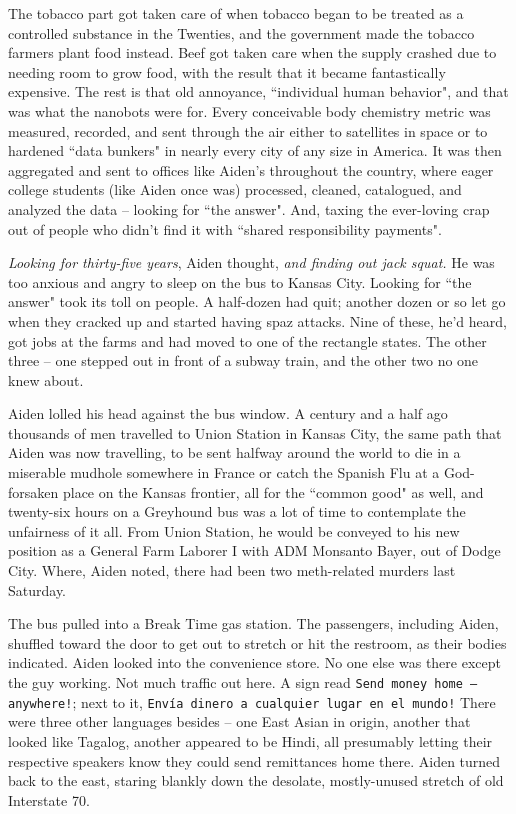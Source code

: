 \documentclass[11pt]{book}
\begin{document}
	The tobacco part got taken care of when tobacco began to be treated as a controlled substance in the Twenties, and the government made the tobacco farmers plant food instead. Beef got taken care when the supply crashed due to needing room to grow food, with the result that it became fantastically expensive. The rest is that old annoyance, ``individual human behavior", and that was what the nanobots were for. Every conceivable body chemistry metric was measured, recorded, and sent through the air either to satellites in space or to hardened ``data bunkers" in nearly every city of any size in America. It was then aggregated and sent to offices like Aiden's throughout the country, where eager college students (like Aiden once was) processed, cleaned, catalogued, and analyzed the data -- looking for ``the answer". And, taxing the ever-loving crap out of people who didn't find it with ``shared responsibility payments".
	
	\textit{Looking for thirty-five years}, Aiden thought, \textit{and finding out jack squat.} He was too anxious and angry to sleep on the bus to Kansas City. Looking for ``the answer" took its toll on people. A half-dozen had quit; another dozen or so let go when they cracked up and started having spaz attacks. Nine of these, he'd heard, got jobs at the farms and had moved to one of the rectangle states. The other three -- one stepped out in front of a subway train, and the other two no one knew about.
	
	Aiden lolled his head against the bus window. A century and a half ago thousands of men travelled to Union Station in Kansas City, the same path that Aiden was now travelling, to be sent halfway around the world to die in a miserable mudhole somewhere in France or catch the Spanish Flu at a God-forsaken place on the Kansas frontier, all for the ``common good" as well, and twenty-six hours on a Greyhound bus was a lot of time to contemplate the unfairness of it all. From Union Station, he would be conveyed to his new position as a General Farm Laborer I with ADM Monsanto Bayer, out of Dodge City. Where, Aiden noted, there had been two meth-related murders last Saturday.
	
	The bus pulled into a Break Time gas station. The passengers, including Aiden, shuffled toward the door to get out to stretch or hit the restroom, as their bodies indicated. Aiden looked into the convenience store. No one else was there except the guy working. Not much traffic out here. A sign read \texttt{Send money home -- anywhere!}; next to it, \texttt{\textexclamdown Envía dinero a cualquier lugar en el mundo!} There were three other languages besides -- one East Asian in origin, another that looked like Tagalog, another appeared to be Hindi, all presumably letting their respective speakers know they could send remittances home there. Aiden turned back to the east, staring blankly down the desolate, mostly-unused stretch of old Interstate 70.
	
\end{document}
